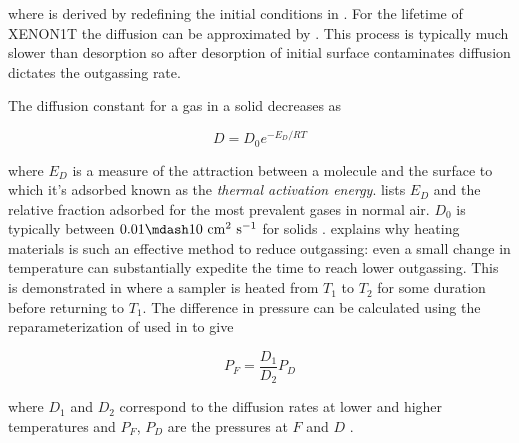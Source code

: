 \noindent where  is derived by redefining the initial conditions in
.  For the lifetime of XENON1T the diffusion can be approximated by
.  This process is typically much slower than desorption so after desorption
of initial surface contaminates diffusion dictates the outgassing rate.

The diffusion constant for a gas in a solid decreases as

\vspace{-10pt}

\begin{equation}
D = D_0 e^{-E_D/RT}
\label{eq:electron_lifetime_model_outgassing_sources_diffusion_temp}
\end{equation}

\noindent where $E_D$ is a measure of the attraction between a molecule and the surface to which it's adsorbed known as the
\textit{thermal activation energy}.   lists $E_D$ and the
relative fraction
adsorbed for the most prevalent gases in normal air.  $D_0$ is typically between $0.01 \mdash 10\ \mathrm{cm^{2}\ s^{-1}}$ for
solids .   explains
why heating materials is such an effective method to reduce outgassing: even a small change in temperature can
substantially expedite the time to reach lower outgassing.  This is demonstrated in
 where a sampler is heated from $T_1$ to $T_2$ for some duration
before returning to $T_1$.  The difference in pressure can be calculated using the reparameterization of
 used in  to
give

\vspace{-10pt}

\begin{equation}
P_F = \frac{D_1}{D_2} P_D
\end{equation}

\noindent where $D_1$ and $D_2$ correspond to the diffusion rates at lower and higher temperatures and $P_F$, $P_D$ are the pressures at
$F$ and $D$ .

